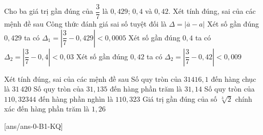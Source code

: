 \begin{ex}%
	Cho ba giá trị gần đúng của $\dfrac{3}{7}$ là $0{,}429$; $0{,}4$ và $0{,}42$. Xét tính đúng, sai của các mệnh đề sau
	\choiceTF
	{\True Công thức đánh giá sai số tuyệt đối là $\Delta=|\overline{a} - a|$}
	{\True Xét số gần đúng $0{,}429$ ta có $\Delta_1=\left|\dfrac{3}{7} - 0{,}429\right|<0{,}0005$}
	{\True Xét số gần đúng $0{,}4$ ta có $\Delta_2=\left|\dfrac{3}{7} - 0{,}4\right|<0{,}03$}
	{\True Xét số gần đúng $0{,}42$ ta có $\Delta_2=\left|\dfrac{3}{7} - 0{,}42\right|<0{,}009$}
\end{ex}
\begin{ex}%
	Xét tính đúng, sai của các mệnh đề sau
	\choiceTF
	{\True Số quy tròn của $31416{,}1$ đến hàng chục là $31\,420$}
	{\True Số quy tròn của $31{,}135$ đến hàng phần trăm là $31{,}14$}
	{Số quy tròn của $110{,}32344$ đến hàng phần nghìn là $110{,}323$}
	{\True Giá trị gần đúng của số $\sqrt[3]{2}$ chính xác đến hàng phần trăm là $1{,}26$}
\end{ex}



[ans/ans-0-B1-KQ]
\caukq

